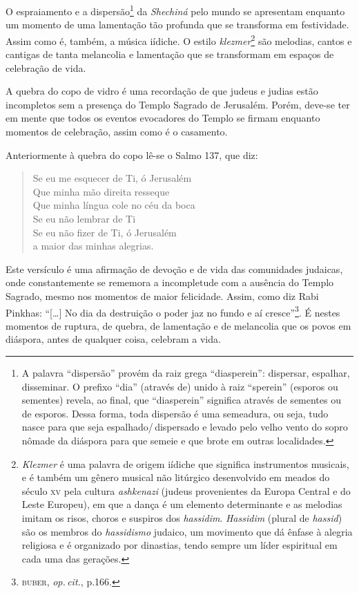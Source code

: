 O espraiamento e a dispersão\footnote{A palavra ``dispersão'' provém da
  raiz grega ``diasperein'': dispersar, espalhar, disseminar. O prefixo
  ``dia'' (através de) unido à raiz ``sperein'' (esporos ou sementes)
  revela, ao final, que ``diasperein'' significa através de sementes ou
  de esporos. Dessa forma, toda dispersão é uma semeadura, ou seja, tudo
  nasce para que seja espalhado/\,dispersado e levado pelo velho vento do
  sopro nômade da diáspora para que semeie e que brote em outras
  localidades.} da \emph{Shechiná} pelo mundo se apresentam enquanto um
momento de uma lamentação tão profunda que se transforma em festividade.
Assim como é, também, a música iídiche. O estilo
\emph{klezmer}\footnote{\emph{Klezmer} é uma palavra de origem
  iídiche que significa instrumentos musicais, e é também um
  gênero musical não litúrgico desenvolvido em meados do século \textsc{xv} pela
  cultura \emph{ashkenazi} (judeus provenientes da Europa Central e do
  Leste Europeu), em que a dança é um elemento determinante e as
  melodias imitam os risos, choros e suspiros dos \emph{hassidim}. \emph{Hassidim} (plural de \emph{hassid}) são os membros do
  \emph{hassidismo} judaico, um movimento que dá ênfase à alegria
  religiosa e é organizado por dinastias, tendo sempre um líder
  espiritual em cada uma das gerações.} são melodias, cantos e cantigas
de tanta melancolia e lamentação que se transformam em espaços de
celebração de vida.

A quebra do copo de vidro é uma recordação de que judeus e judias estão
incompletos sem a presença do Templo Sagrado de Jerusalém. Porém,
deve-se ter em mente que todos os eventos evocadores do Templo se firmam
enquanto momentos de celebração, assim como é o casamento.

Anteriormente à quebra do copo lê-se o Salmo 137, que diz: 

\begin{verse}
Se eu me esquecer de Ti, ó Jerusalém\\
Que minha mão direita resseque\\
Que minha língua cole no céu da boca\\
Se eu não lembrar de Ti\\
Se eu não fizer de Ti, ó Jerusalém\\
a maior das minhas alegrias.
\end{verse}

Este versículo é uma afirmação de devoção e de vida das comunidades judaicas, onde
constantemente se rememora a incompletude com a ausência do Templo
Sagrado, mesmo nos momentos de maior felicidade. Assim, como diz Rabi
Pinkhas: ``{[}\ldots{}{]} No dia da destruição o poder jaz no fundo e
aí cresce''\footnote{\textsc{buber}, \emph{op.\,cit.}, p.166.}. É nestes momentos de
ruptura, de quebra, de lamentação e de melancolia que os povos em
diáspora, antes de qualquer coisa, celebram a vida.

